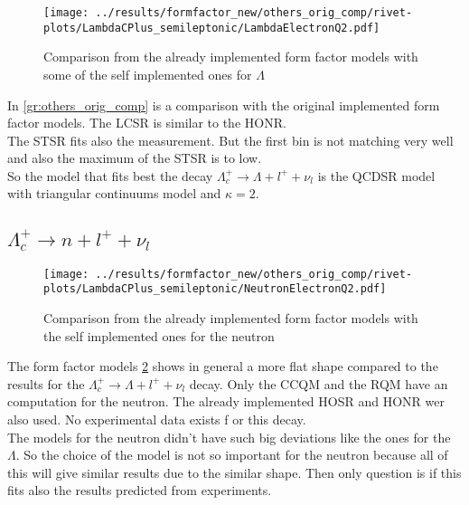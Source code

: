\begin{figure}[h]
  \centering
  \texttt{[image: ../results/formfactor\_new/others\_orig\_comp/rivet-plots/LambdaCPlus\_semileptonic/LambdaElectronQ2.pdf]}
  \caption{Comparison from the already implemented form factor models with 
  some of the self implemented ones for \(\Lambda\)} \label{gr:others_orig_comp}
\end{figure}
In {\eqref{gr:others_orig_comp}} is a comparison with the original implemented 
form factor models. The LCSR is similar to the HONR.\\
The STSR fits also the measurement. But the first bin is not matching 
very well and also the maximum of the STSR is to low.\\

So the model that fits best the decay \(\Lambda_c^+ \rightarrow \Lambda + l^+ + \nu_l\) 
is the QCDSR model with triangular continuums model and \(\kappa = 2\).


\clearpage
\subsection{\(\Lambda_c^+ \rightarrow n + l^+ + \nu_l\)}
\begin{figure}[h]
  \centering
  \texttt{[image: ../results/formfactor\_new/others\_orig\_comp/rivet-plots/LambdaCPlus\_semileptonic/NeutronElectronQ2.pdf]}
  \caption{Comparison from the already implemented form factor models with 
  the self implemented ones for the neutron} \label{gr:others_orig_comp_n}
\end{figure}
The form factor models {\ref{gr:others_orig_comp_n}} shows in general a more 
flat shape compared to the results for the \(\Lambda_c^+ \rightarrow \Lambda + l^+ + \nu_l\) 
decay. Only the CCQM and the RQM have an computation for the neutron.
The already implemented HOSR and HONR wer also used. No experimental data exists f
or this decay.\\ 
The models for the neutron didn't have such big deviations like the ones for the \(\Lambda\). 
So the choice of the model is not so important for the neutron because all of this 
will give similar results due to the similar shape. Then only question is if this 
fits also the results predicted from experiments.

